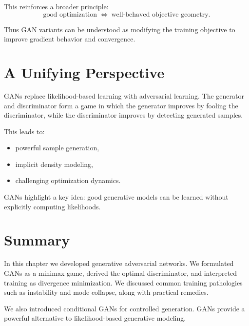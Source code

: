 This reinforces a broader principle:
\[
\text{good optimization} \;\Longleftrightarrow\; \text{well-behaved objective geometry}.
\]

Thus GAN variants can be understood as modifying the training objective to improve gradient behavior and convergence.

\section{A Unifying Perspective}

GANs replace likelihood-based learning with adversarial learning. The generator and discriminator form a game in which the generator improves by fooling the discriminator, while the discriminator improves by detecting generated samples.

This leads to:
\begin{itemize}
    \item powerful sample generation,
    \item implicit density modeling,
    \item challenging optimization dynamics.
\end{itemize}

GANs highlight a key idea: good generative models can be learned without explicitly computing likelihoods.

\section{Summary}

In this chapter we developed generative adversarial networks. We formulated GANs as a minimax game, derived the optimal discriminator, and interpreted training as divergence minimization. We discussed common training pathologies such as instability and mode collapse, along with practical remedies.

We also introduced conditional GANs for controlled generation. GANs provide a powerful alternative to likelihood-based generative modeling.